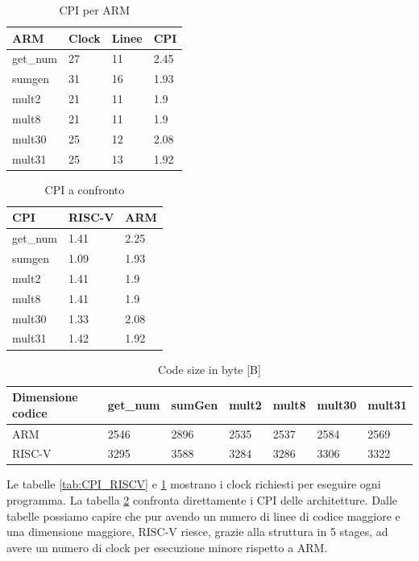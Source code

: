 \documentclass[12pt, a4paper]{report}
\begin{document}
\begin{table}[ht]
\centering
\begin{tabular}{|l|l|l|l|}
\hline
ARM  & Clock & Linee & CPI  \\ \hline
get\_num & 27    & 11    & 2.45 \\ \hline
sumgen   & 31    & 16    & 1.93 \\ \hline
mult2    & 21    & 11    & 1.9  \\ \hline
mult8    & 21    & 11    & 1.9  \\ \hline
mult30   & 25    & 12    & 2.08 \\ \hline
mult31   & 25    & 13    & 1.92 \\ \hline
\end{tabular}
\caption{CPI per ARM}
\label{tab:CPI_ARM}
\end{table}

\begin{table}[ht]
\centering
\begin{tabular}{|l|l|l|}
\hline
CPI  & RISC-V & ARM   \\ \hline
get\_num & 1.41 & 2.25     \\ \hline
sumgen   & 1.09 & 1.93     \\ \hline
mult2    & 1.41 & 1.9      \\ \hline
mult8    & 1.41 & 1.9      \\ \hline
mult30   & 1.33 & 2.08   \\ \hline
mult31   & 1.42 & 1.92  \\ \hline
\end{tabular}
\caption{CPI a confronto}
\label{tab:CPI_RISC-V_ARM}
\end{table}

\begin{table}[ht]
\centering
\begin{tabular}{|l|l|l|l|l|l|l|}
\hline
Dimensione codice & get\_num & sumGen & mult2 & mult8 & mult30 & mult31 \\ \hline
ARM           & 2546     & 2896   & 2535  & 2537  & 2584   & 2569   \\ \hline
RISC-V               & 3295     & 3588   & 3284  & 3286  & 3306   & 3322   \\ \hline
\end{tabular}
\caption{Code size in byte [B]}
\end{table}

Le tabelle \ref{tab:CPI_RISCV} e \ref{tab:CPI_ARM} mostrano i clock richiesti per eseguire ogni programma. La tabella \ref{tab:CPI_RISC-V_ARM} confronta direttamente i CPI delle architetture. Dalle tabelle possiamo capire che pur avendo un numero di linee di codice maggiore e una dimensione maggiore, RISC-V riesce, grazie alla struttura in 5 stages, ad avere un numero di clock per esecuzione minore rispetto a ARM. %
\end{document}
